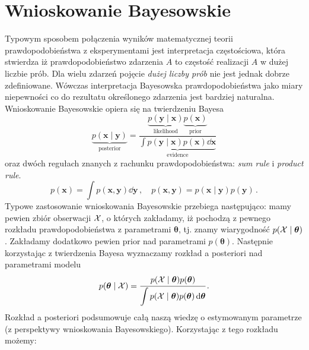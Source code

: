 \documentclass{myclass}
\begin{document}
\section{Wnioskowanie Bayesowskie}

Typowym sposobem połączenia wyników matematycznej teorii prawdopodobieństwa z eksperymentami jest
interpretacja częstościowa, która stwierdza iż prawdopodobieństwo zdarzenia \(A\) to częstość
realizacji \(A\) w dużej liczbie prób. Dla wielu zdarzeń pojęcie \emph{dużej liczby prób} nie jest
jednak dobrze zdefiniowane. Wówczas interpretacja Bayesowska prawdopodobieństwa jako miary
niepewności co do rezultatu określonego zdarzenia jest bardziej naturalna. Wnioskowanie Bayesowskie
opiera się na twierdzeniu Bayesa 
\[
\boxed{
\underbrace{p(\bm{x} \mid \bm{y})}_{\text{posterior}} = \frac{ \underbrace{p(\bm{y} \mid \bm{x})}_{\text{likelihood}} \underbrace{p(\bm{x})}_{\text{prior}}}{\underbrace{\int p(\bm{y} \mid \bm{x}) p(\bm{x}) \dd{\bm{x}}}_{\text{evidence}}}
}
\]
oraz dwóch regułach znanych z rachunku prawdopodobieństwa: \emph{sum rule} i \emph{product rule}.
\[
    p(\bm{x}) = \int p(\bm{x}, \bm{y}) \dd{\bm{y}} \,,\quad p(\bm{x}, \bm{y}) = p(\bm{x} \mid \bm{y}) p(\bm{y})\,.
\]
Typowe zastosowanie wnioskowania Bayesowskie przebiega następująco: mamy pewien zbiór obserwacji
\(\mathcal{X}\), o których zakładamy, iż pochodzą z pewnego rozkładu prawdopodobieństwa z parametrami
\(\bm{\theta}\), tj. znamy wiarygodność \(p(\mathcal{X} \mid \bm{\theta})\). Zakładamy dodatkowo pewien
prior nad parametrami \(p(\bm{\theta})\). Następnie korzystając z twierdzenia Bayesa wyznaczamy
rozkład a posteriori nad parametrami modelu
\[
    p(\bm{\theta} \mid \mathcal{X}) = \cfrac{p(\mathcal{X} \mid \bm{\theta}) p(\bm{\theta})}{ \displaystyle \int p(\mathcal{X} \mid \bm{\theta}) p(\bm{\theta}) \dd{\bm{\theta}}} \,.
\]
Rozkład a posteriori podsumowuje całą naszą wiedzę o estymowanym parametrze (z perspektywy
wnioskowania Bayesowskiego). Korzystając z tego rozkładu możemy:
\end{document}
